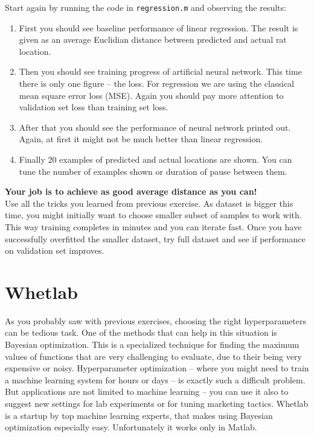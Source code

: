 \documentclass[a4paper,11pt]{article}
\begin{document}
Start again by running the code in \texttt{regression.m} and observing the results:

\begin{enumerate}
	\item First you should see baseline performance of linear regression. The result is given as an average Euclidian distance between predicted and actual rat location.
	\item Then you should see training progress of artificial neural network. This time there is only one figure -- the loss. For regression we are using the classical mean square error loss (MSE). Again you should pay more attention to validation set loss than training set loss.
	\item After that you should see the performance of neural network printed out. Again, at first it might not be much better than linear regression.
	\item Finally 20 examples of predicted and actual locations are shown. You can tune the number of examples shown or duration of pause between them.
\end{enumerate}

\textbf{Your job is to achieve as good average distance as you can!}\\

Use all the tricks you learned from previous exercise. As dataset is bigger this time, you might initially want to choose smaller subset of samples to work with. This way training completes in minutes and you can iterate fast. Once you have successfully overfitted the smaller dataset, try full dataset and see if performance on validation set improves.

%
%
\section{Whetlab}

As you probably saw with previous exercises, choosing the right hyperparameters can be tedious task. One of the methods that can help in this situation is Bayesian optimization. This is a specialized technique for finding the maximum values of functions that are very challenging to evaluate, due to their being very expensive or noisy. Hyperparameter optimization -- where you might need to train a machine learning system for hours or days -- is exactly such a difficult problem. But applications are not limited to machine learning -- you can use it also to suggest new settings for lab experiments or for tuning marketing tactics. Whetlab is a startup by top machine learning experts, that makes using Bayesian optimization especially easy. Unfortunately it works only in Matlab.\\
\end{document}
